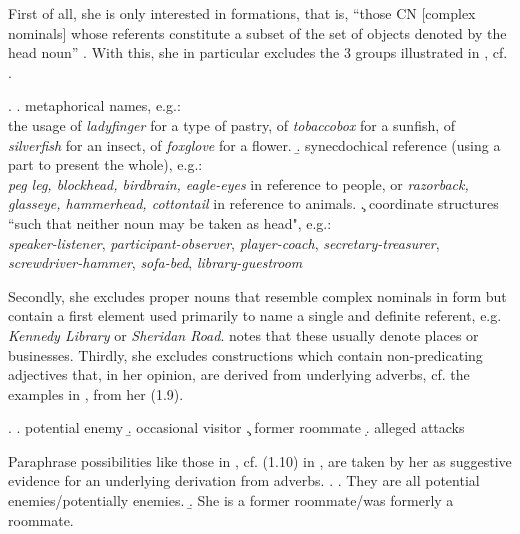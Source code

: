 First of all, she is only interested in  formations, that
is, ``those CN [complex nominals] whose referents
  constitute a subset of the set of objects denoted by the head
  noun'' \citep[6]{Levi:1978}. With this, she in particular excludes the
  3 groups illustrated in \Next, cf. \citet[6]{Levi:1978}.

\ex. \a. metaphorical names, e.g.:\\ the usage of \emph{ladyfinger} for
a type of pastry, of \emph{tobaccobox} for a sunfish, of
\emph{silverfish} for an insect, of \emph{foxglove} for a flower.
\b. synecdochical reference (using a part to present the whole), e.g.:\\ \emph{peg leg, blockhead, birdbrain,
      eagle-eyes} in reference to people, or \emph{razorback,
      glasseye, hammerhead, cottontail}  in reference to animals. 
\c. coordinate structures ``such that neither noun may be taken as
head", e.g.:\\ 
\emph{speaker-listener},
      \emph{participant-observer}, \emph{player-coach}, \emph{secretary-trea\-sur\-er},
      \emph{screwdriver-hammer}, \emph{sofa-bed}, \emph{library-guestroom}

Secondly, she excludes proper nouns that resemble complex nominals in form but contain a first element
  used primarily to name a single and definite referent, e.g.
  \emph{Kennedy Library} or \emph{Sheridan
    Road}.
 \citet[7]{Levi:1978}
  notes that these usually denote places or businesses. Thirdly, she excludes
  constructions which contain non-predicating adjectives that, in her opinion,  are derived from underlying
  adverbs, cf. the examples in \Next, from her
  (1.9).

\enlargethispage{1\baselineskip}
\ex. \a. potential enemy \b. occasional visitor \c. former roommate
\d. alleged attacks

Paraphrase possibilities like those in \Next, cf. (1.10) in
\citet[8]{Levi:1978}, are taken by her as suggestive evidence
for an underlying derivation from adverbs.
\ex. \a. They are all potential enemies/potentially enemies.
\b. She is a former roommate/was formerly a roommate.


